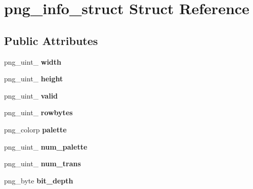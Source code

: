 \hypertarget{structpng__info__struct}{\section{png\+\_\+info\+\_\+struct Struct Reference}
\label{structpng__info__struct}
}
\subsection*{Public Attributes}
\begin{DoxyCompactItemize}
\item 
\hypertarget{structpng__info__struct_aa47a2f299ef1098baf496eb2a13b4aea}{png\+\_\+uint\+\_ {\bfseries width}}\label{structpng__info__struct_aa47a2f299ef1098baf496eb2a13b4aea}

\item 
\hypertarget{structpng__info__struct_a54ff13ac729e893eaedd5499a299ca2f}{png\+\_\+uint\+\_ {\bfseries height}}\label{structpng__info__struct_a54ff13ac729e893eaedd5499a299ca2f}

\item 
\hypertarget{structpng__info__struct_a08aa92305b7d99d7106488382261a0e6}{png\+\_\+uint\+\_ {\bfseries valid}}\label{structpng__info__struct_a08aa92305b7d99d7106488382261a0e6}

\item 
\hypertarget{structpng__info__struct_a8f5174bd85ca4fb3c861218308b251cf}{png\+\_\+uint\+\_ {\bfseries rowbytes}}\label{structpng__info__struct_a8f5174bd85ca4fb3c861218308b251cf}

\item 
\hypertarget{structpng__info__struct_a964025dabd72160ffa2984040ddc5f3b}{png\+\_\+colorp {\bfseries palette}}\label{structpng__info__struct_a964025dabd72160ffa2984040ddc5f3b}

\item 
\hypertarget{structpng__info__struct_abf77cf402e77c9287dd0d366470c0d55}{png\+\_\+uint\+\_ {\bfseries num\+\_\+palette}}\label{structpng__info__struct_abf77cf402e77c9287dd0d366470c0d55}

\item 
\hypertarget{structpng__info__struct_a47904541719f53ddccd79e09f87f3abb}{png\+\_\+uint\+\_ {\bfseries num\+\_\+trans}}\label{structpng__info__struct_a47904541719f53ddccd79e09f87f3abb}

\item 
\hypertarget{structpng__info__struct_a492691764472633c7e046d0b80f9a3a5}{png\+\_\+byte {\bfseries bit\+\_\+depth}}\label{structpng__info__struct_a492691764472633c7e046d0b80f9a3a5}


\end{DoxyCompactItemize}
